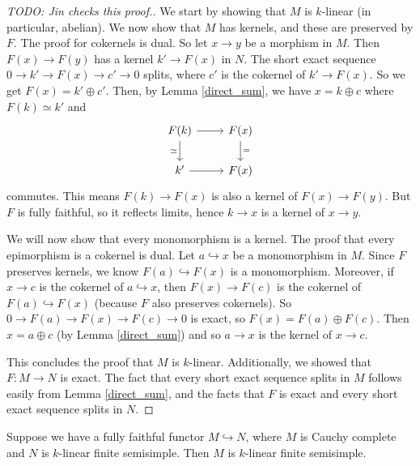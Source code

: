 \begin{proof}
  [TODO: Jin checks this proof.]

  We start by showing that $M$ is $k$-linear (in particular, abelian). We now
  show that $M$ has kernels, and these are preserved by $F$. The proof for
  cokernels is dual. So let $x\to y$ be a morphism in $M$. Then $F(x)\to F(y)$ has
  a kernel $k'\to F(x)$ in $N$. The short exact sequence $0\to k'\to F(x)\to c'\to 0$
  splits, where $c'$ is the cokernel of $k'\to F(x)$. So we get $F(x)=k'\oplus c'$.
  Then, by Lemma \ref{direct_sum}, we have $x=k\oplus c$ where $F(k)\simeq k'$ and
  \[
    \begin{tikzcd}
      {F(k)} & {F(x)} \\
      {k'} & {F(x)} \arrow[from=1-1, to=1-2] \arrow["\simeq"', from=1-1, to=2-1] \arrow["{=}", from=1-2, to=2-2] \arrow[from=2-1, to=2-2]
    \end{tikzcd}
  \]
  commutes. This means $F(k)\to F(x)$ is also a kernel of $F(x)\to F(y)$. But
  $F$ is fully faithful, so it reflects limits, hence $k\to x$ is a kernel of
  $x\to y$.

  We will now show that every monomorphism is a kernel. The proof that every
  epimorphism is a cokernel is dual. Let $a\hookrightarrow x$ be a
  monomorphism in $M$. Since $F$ preserves kernels, we know
  $F(a)\hookrightarrow F(x)$ is a monomorphism. Moreover, if $x\to c$ is the
  cokernel of $a\hookrightarrow x$, then $F(x)\to F(c)$ is the cokernel of
  $F(a)\hookrightarrow F(x)$ (because $F$ also preserves cokernels). So $0\to F(a)\to F(x)\to F(c)\to 0$ is exact, so
  $F(x)=F(a)\oplus F(c)$. Then $x=a\oplus c$ (by Lemma \ref{direct_sum}) and
  so $a\to x$ is the kernel of $x\to c$.

  This concludes the proof that $M$ is $k$-linear. Additionally, we showed that $F:M\to N$ is exact. The fact that every short exact sequence splits in $M$ follows easily from
  Lemma \ref{direct_sum}, and the facts that $F$ is exact and every short
  exact sequence splits in $N$.
\end{proof}

\begin{proposition}\label{cau_semi}
  Suppose we have a fully faithful functor $M\hookrightarrow N$,
  where $M$ is Cauchy complete and $N$ is $k$-linear finite semisimple. Then
  $M$ is $k$-linear finite semisimple.
\end{proposition}

